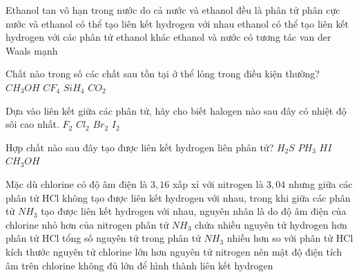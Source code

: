 \begin{ex}
	Ethanol tan vô hạn trong nước do
	\choice
	{cả nước và ethanol đều là phân tử phân cực}
	{\True nước và ethanol có thể tạo liên kết hydrogen với nhau}
	{ethanol có thể tạo liên kết hydrogen với các phân tử ethanol khác}
	{ethanol và nước có tương tác van der Waals mạnh}
	\loigiai{}
\end{ex}

\begin{ex}
	Chất nào trong số các chất sau tồn tại ở thể lỏng trong điều kiện thường?
	\choice
	{\True $CH_3OH$}
	{$CF_4$}
	{$SiH_4$}
	{$CO_2$}
\end{ex}

\begin{ex}
	Dựa vào liên kết giữa các phân tử, hãy cho biết halogen nào sau đây có nhiệt
	độ sôi cao nhất.
	\choice
	{$F_2$}
	{$Cl_2$}
	{$Br_2$}
	{\True $I_2$}
\end{ex}


\begin{ex}
	Hợp chất nào sau đây tạo được liên kết hydrogen liên phân tử?
	\choice
	{$H_2S$}
	{$PH_3$}
	{$HI$}
	{\True $CH_3OH$}
	\loigiai{}
\end{ex}

\begin{ex}
	Mặc dù chlorine có độ âm điện là $3{,}16$ xấp xỉ với nitrogen là $3{,}04$ nhưng giữa
	các phân tử HCl không tạo được liên kết hydrogen với nhau, trong khi giữa
	các phân tử $NH_3$ tạo được liên kết hydrogen với nhau, nguyên nhân là do
	\choice
	{độ âm điện của chlorine nhỏ hơn của nitrogen}
	{phân tử $NH_3$ chứa nhiều nguyên tử hydrogen hơn phân tử HCl}
	{tổng số nguyên tử trong phân tử $NH_3$ nhiều hơn so với phân tử HCl}
	{\True kích thước nguyên tử chlorine lớn hơn nguyên tử nitrogen nên mật độ điện
		tích âm trên chlorine không đủ lớn để hình thành liên kết hydrogen}
	\loigiai{}
\end{ex}

